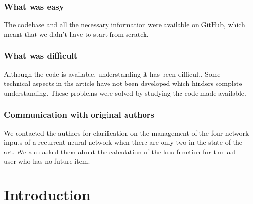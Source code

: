 \subsubsection{What was easy}

The codebase and all the necessary information were available on \href{https://github.com/srijankr/jodie}{GitHub}, which meant that we didn't have to start from scratch.

\subsubsection{What was difficult}

Although the code is available, understanding it has been difficult. Some technical aspects in the article have not been developed which hinders complete understanding. These problems were solved by studying the code made available.

\subsubsection{Communication with original authors}

We contacted the authors for clarification on the management of the four network inputs of a recurrent neural network when there are only two in the state of the art. We also asked them about the calculation of the loss function for the last user who has no future item.

\newpage

\section*{Introduction}


